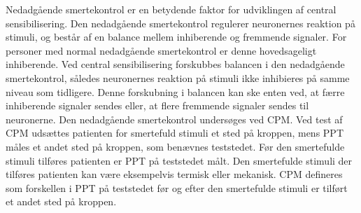 Nedadgående smertekontrol er en betydende faktor for udviklingen af central sensibilisering. Den nedadgående smertekontrol regulerer neuronernes reaktion på stimuli, og består af en balance mellem inhiberende og fremmende signaler. For personer med normal nedadgående smertekontrol er denne hovedsageligt inhiberende. Ved central sensibilisering forskubbes balancen i den nedadgående smertekontrol, således neuronernes reaktion på stimuli ikke inhibieres på samme niveau som tidligere. Denne forskubning i balancen kan ske enten ved, at færre inhiberende signaler sendes eller, at flere fremmende signaler sendes til neuronerne. \citep{Arendt-Nielsen2015} Den nedadgående smertekontrol undersøges ved CPM. Ved test af CPM udsættes patienten for smertefuld stimuli et sted på kroppen, mens PPT måles et andet sted på kroppen, som benævnes teststedet. Før den smertefulde stimuli tilføres patienten er PPT på teststedet målt. \citep{Petersen2016} Den smertefulde stimuli der tilføres patienten kan være eksempelvis termisk eller mekanisk. CPM defineres som forskellen i PPT på teststedet før og efter den smertefulde stimuli er tilført et andet sted på kroppen. \citep{Petersen2015b} 
     
    